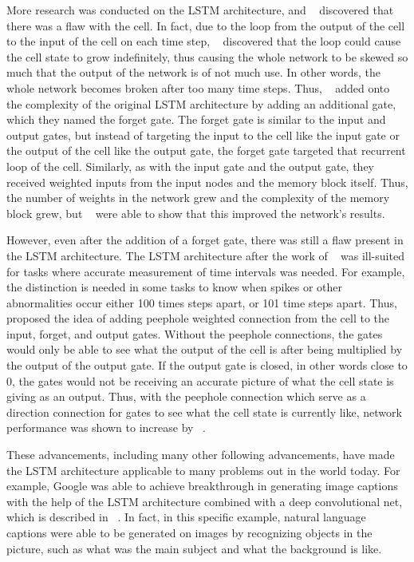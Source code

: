 \documentclass[11pt,letterpaper]{article}
\begin{document}
	More research was conducted on the LSTM architecture, and ~\cite{Gers:99} discovered that there was a flaw with the cell. In fact, due to the loop from the output of the cell to the input of the cell on each time step, ~\cite{Gers:99} discovered that the loop could cause the cell state to grow indefinitely, thus causing the whole network to be skewed so much that the output of the network is of not much use. In other words, the whole network becomes broken after too many time steps. Thus, ~\cite{Gers:99} added onto the complexity of the original LSTM architecture by adding an additional gate, which they named the forget gate. The forget gate is similar to the input and output gates, but instead of targeting the input to the cell like the input gate or the output of the cell like the output gate, the forget gate targeted that recurrent loop of the cell. Similarly, as with the input gate and the output gate, they received weighted inputs from the input nodes and the memory block itself. Thus, the number of weights in the network grew and the complexity of the memory block grew, but ~\cite{Gers:99} were able to show that this improved the network's results.

	However, even after the addition of a forget gate, there was still a flaw present in the LSTM architecture. The LSTM architecture after the work of ~\cite{Gers:99} was ill-suited for tasks where accurate measurement of time intervals was needed. For example, the distinction is needed in some tasks to know when spikes or other abnormalities occur either 100 times steps apart, or 101 time steps apart. Thus, ~\cite{Gers:02} proposed the idea of adding peephole weighted connection from the cell to the input, forget, and output gates. Without the peephole connections, the gates would only be able to see what the output of the cell is after being multiplied by the output of the output gate. If the output gate is closed, in other words close to 0, the gates would not be receiving an accurate picture of what the cell state is giving as an output. Thus, with the peephole connection which serve as a direction connection for gates to see what the cell state is currently like, network performance was shown to increase by ~\cite{Gers:02}.

	These advancements, including many other following advancements, have made the LSTM architecture applicable to many problems out in the world today. For example, Google was able to achieve breakthrough in generating image captions with the help of the LSTM architecture combined with a deep convolutional net, which is described in ~\cite{Vinyals:14}. In fact, in this specific example, natural language captions were able to be generated on images by recognizing objects in the picture, such as what was the main subject and what the background is like.
\end{document}
